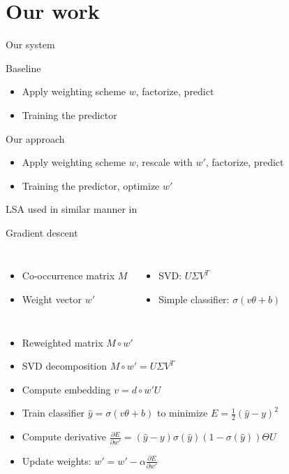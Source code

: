 \documentclass[xcolor={table}]{beamer}
\begin{document}
\section{Our work}
\begin{frame}{Our system}
    \begin{block}{Baseline}
        \begin{itemize}
            \item Apply weighting scheme $w$, factorize, predict 
            \item Training the predictor
        \end{itemize}
    \end{block}

    \begin{block}{Our approach}
        \begin{itemize}
            
            \item Apply weighting scheme $w$, rescale with $w'$, factorize, predict 
            \item Training the predictor, optimize $w'$
        \end{itemize}
    \end{block}
    
    LSA used in similar manner in \cite{ionescu2015training}
\end{frame} 

\begin{frame}{Gradient descent}
    \begin{columns}    
    \begin{itemize}
        \item Co-occurrence matrix $M$
        \item Weight vector $w'$
    \end{itemize}
    \begin{itemize}
        \item SVD: $U \Sigma V^T$
        \item Simple classifier: $\sigma (v \theta + b)$
    \end{itemize}    
    \end{columns}

    \begin{block}{}
    \begin{itemize}
        \item Reweighted matrix $M \circ w'$
        \item SVD decomposition $M \circ w' = U \Sigma V^T$
        \item Compute embedding $v = d \circ w' U$
        \item Train classifier $\hat{y} = \sigma (v \theta + b)$ to minimize $E = \frac{1}{2}(\hat{y}-y)^2$
        \item Compute derivative $\frac{\partial E}{\partial w'} = (\hat{y} -y) \sigma(\hat{y}) (1-\sigma(\hat{y}))\Theta U$
        \item Update weights: $w' = w' - \alpha \frac{\partial E}{\partial w'}$
    \end{itemize}    
    \end{block}
\end{frame} 
\end{document}

